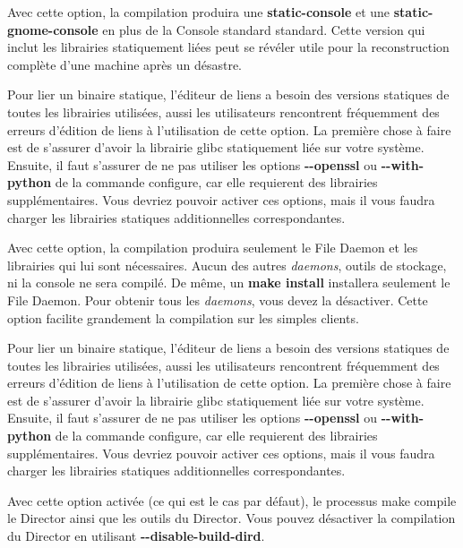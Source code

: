 {{{\begin{description}
{\item [{-}{-}enable-static-cons]
   Avec cette option, la compilation produira une {\bf static-console}  et une
{\bf static-gnome-console} en plus de la Console standard standard. Cette
version qui  inclut les librairies statiquement li\'ees peut se r\'ev\'eler
utile pour la reconstruction compl\`ete  d'une machine apr\`es un d\'esastre. 

Pour lier un binaire statique, l'\'editeur de liens a besoin des versions
statiques de toutes les librairies utilis\'ees, aussi les utilisateurs
rencontrent fr\'equemment des erreurs d'\'edition de liens \`a l'utilisation
de cette option. La premi\`ere chose \`a faire est de s'assurer d'avoir la
librairie glibc statiquement li\'ee sur votre syst\`eme. Ensuite, il faut
s'assurer de ne pas utiliser les options {\bf {-}{-}openssl} ou
{\bf {-}{-}with-python} de la commande configure, car elle requierent des
librairies suppl\'ementaires. Vous devriez pouvoir activer ces options, mais
il vous faudra charger les librairies statiques additionnelles correspondantes.

\item [{-}{-}enable-client-only]
   Avec cette option, la compilation produira seulement le File Daemon  et les
librairies qui lui sont n\'ecessaires. Aucun des autres {\it daemons}, outils
de stockage, ni  la console ne sera compil\'e. De m\^eme, un {\bf make
install} installera seulement le File Daemon.  Pour obtenir tous les {\it
daemons}, vous devez la d\'esactiver. Cette option facilite grandement  la
compilation sur les simples clients.  

Pour lier un binaire statique, l'\'editeur de liens a besoin des versions
statiques de toutes les librairies utilis\'ees, aussi les utilisateurs
rencontrent fr\'equemment des erreurs d'\'edition de liens \`a l'utilisation
de cette option. La premi\`ere chose \`a faire est de s'assurer d'avoir la
librairie glibc statiquement li\'ee sur votre syst\`eme. Ensuite, il faut
s'assurer de ne pas utiliser les options {\bf {-}{-}openssl} ou
{\bf {-}{-}with-python} de la commande configure, car elle requierent des
librairies suppl\'ementaires. Vous devriez pouvoir activer ces options, mais
il vous faudra charger les librairies statiques additionnelles correspondantes.

\item [ {-}{-}enable-build-dird]
Avec cette option activ\'ee (ce  qui est le cas par d\'efaut), le processus make 
compile le Director ainsi que les outils du Director. Vous pouvez d\'esactiver 
la compilation du Director en utilisant {\bf {-}{-}disable-build-dird}.

}
\end{description}}}}
